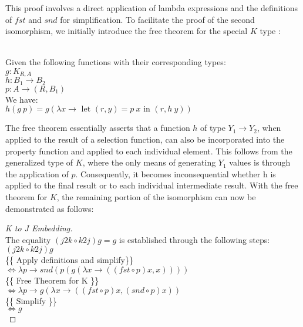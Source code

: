\documentclass[runningheads]{llncs}
\begin{document}
This proof involves a direct application of lambda expressions and the
definitions of \(fst\) and \(snd\) for simplification. To facilitate the
proof of the second isomorphism, we initially introduce the free theorem
for the special \(K\) type \cite{wadler1989theorems}:

\begin{theorem}\\
Given the following functions with their corresponding types:\\
$g : K_{R,A}$\\
$h : B_1 \rightarrow B_2$\\
$p : A \rightarrow (R, B_1)$\\
We have:\\
$h (g\:p) = g (\lambda x \rightarrow  \text{ let }(r,y) = p\:x \text{ in }(r,h\:y))$
\end{theorem}

The free theorem essentially asserts that a function \(h\) of type
\(Y_1 \rightarrow Y_2\), when applied to the result of a selection
function, can also be incorporated into the property function and
applied to each individual element. This follows from the generalized
type of \(K\), where the only means of generating \(Y_1\) values is
through the application of \(p\). Consequently, it becomes
inconsequential whether h is applied to the final result or to each
individual intermediate result. With the free theorem for \(K\), the
remaining portion of the isomorphism can now be demonstrated as follows:

\begin{proof}[K to J Embedding]\\
The equality $(j2k \circ k2j) g = g$ is established through the following steps:\\
$(j2k \circ k2j) g$\\
\{\{ Apply definitions and simplify\}\}\\
$\iff \lambda p \rightarrow snd (p (g (\lambda x \rightarrow ((fst \circ p) x, x))))$\\
\{\{ Free Theorem for K \}\}\\
$\iff \lambda p \rightarrow g (\lambda x \rightarrow ((fst \circ p) x, (snd \circ p) x))$\\
\{\{ Simplify \}\}\\
$\iff g$\\

\end{proof}
\end{document}

